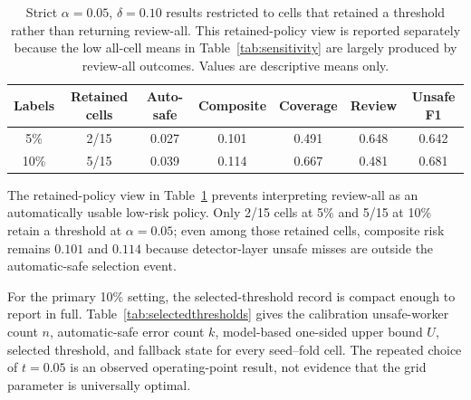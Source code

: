 \documentclass[iicol,pdflatex,sn-mathphys-num]{sn-jnl}
\begin{document}
\begin{table}[t]
\caption{Strict $\alpha=0.05$, $\delta=0.10$ results restricted to cells that retained a threshold rather than returning review-all. This retained-policy view is reported separately because the low all-cell means in Table~\ref{tab:sensitivity} are largely produced by review-all outcomes. Values are descriptive means only.}
\label{tab:strictretained}
\centering
\scriptsize
\setlength{\tabcolsep}{5pt}
\begin{tabular}{@{}c c c c c c c@{}}
\toprule
Labels & Retained cells & Auto-safe & Composite & Coverage & Review & Unsafe F1 \\
\midrule
5\%  & 2/15 & 0.027 & 0.101 & 0.491 & 0.648 & 0.642 \\
10\% & 5/15 & 0.039 & 0.114 & 0.667 & 0.481 & 0.681 \\
\bottomrule
\end{tabular}
\end{table}

The retained-policy view in Table~\ref{tab:strictretained} prevents interpreting review-all as an automatically usable low-risk policy. Only 2/15 cells at 5\% and 5/15 at 10\% retain a threshold at $\alpha=0.05$; even among those retained cells, composite risk remains $0.101$ and $0.114$ because detector-layer unsafe misses are outside the automatic-safe selection event.

For the primary 10\% setting, the selected-threshold record is compact enough to report in full. Table~\ref{tab:selectedthresholds} gives the calibration unsafe-worker count $n$, automatic-safe error count $k$, model-based one-sided upper bound $U$, selected threshold, and fallback state for every seed--fold cell. The repeated choice of $t=0.05$ is an observed operating-point result, not evidence that the grid parameter is universally optimal.
\end{document}
